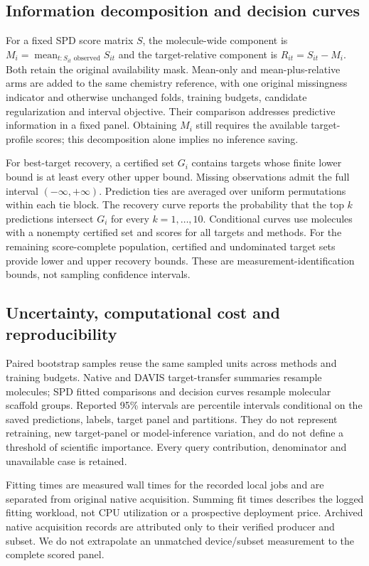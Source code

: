 \documentclass[pdflatex, sn-nature]{sn-jnl}
\begin{document}
\subsection{Information decomposition and decision curves}
For a fixed SPD score matrix $S$, the molecule-wide component is $M_i=\operatorname{mean}_{t: S_{it}\text{ observed}}S_{it}$ and the target-relative component is $R_{it}=S_{it}-M_i$. Both retain the original availability mask. Mean-only and mean-plus-relative arms are added to the same chemistry reference, with one original missingness indicator and otherwise unchanged folds, training budgets, candidate regularization and interval objective. Their comparison addresses predictive information in a fixed panel. Obtaining $M_i$ still requires the available target-profile scores; this decomposition alone implies no inference saving.

For best-target recovery, a certified set $G_i$ contains targets whose finite lower bound is at least every other upper bound. Missing observations admit the full interval $(-\infty,+\infty)$. Prediction ties are averaged over uniform permutations within each tie block. The recovery curve reports the probability that the top $k$ predictions intersect $G_i$ for every $k=1,\ldots, 10$. Conditional curves use molecules with a nonempty certified set and scores for all targets and methods. For the remaining score-complete population, certified and undominated target sets provide lower and upper recovery bounds. These are measurement-identification bounds, not sampling confidence intervals.

\subsection{Uncertainty, computational cost and reproducibility}
Paired bootstrap samples reuse the same sampled units across methods and training budgets. Native and DAVIS target-transfer summaries resample molecules; SPD fitted comparisons and decision curves resample molecular scaffold groups. Reported 95\% intervals are percentile intervals conditional on the saved predictions, labels, target panel and partitions. They do not represent retraining, new target-panel or model-inference variation, and do not define a threshold of scientific importance. Every query contribution, denominator and unavailable case is retained.

Fitting times are measured wall times for the recorded local jobs and are separated from original native acquisition. Summing fit times describes the logged fitting workload, not CPU utilization or a prospective deployment price. Archived native acquisition records are attributed only to their verified producer and subset. We do not extrapolate an unmatched device/subset measurement to the complete scored panel.
\end{document}

